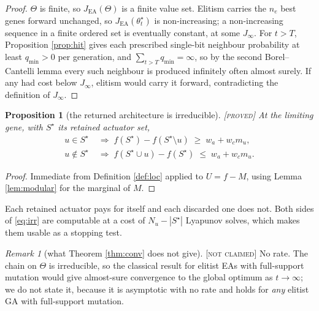 \documentclass[11pt]{article}
\newtheorem{proposition}[theorem]{Proposition}
\theoremstyle{definition}
\theoremstyle{remark}
\newtheorem{remark}[theorem]{Remark}
\newcommand{\JEA}{J_{\mathrm{EA}}}
\newcommand{\Sstar}{S^{\star}}
\newcommand{\tagged}[1]{\textsc{[#1]}}
\begin{document}
\begin{proof}
$\Theta$ is finite, so $\JEA(\Theta)$ is a finite value set. Elitism carries the
$n_e$ best genes forward unchanged, so $\JEA(\theta^\star_t)$ is non-increasing; a
non-increasing sequence in a finite ordered set is eventually constant, at some
$J_\infty$. For $t > T$, Proposition \ref{prop:hit} gives each prescribed
single-bit neighbour probability at least $q_{\min} > 0$ per generation, and
$\sum_{t>T} q_{\min} = \infty$, so by the second Borel--Cantelli lemma every such
neighbour is produced infinitely often almost surely. If any had cost below
$J_\infty$, elitism would carry it forward, contradicting the definition of
$J_\infty$.
\end{proof}

\begin{proposition}[the returned architecture is irreducible]\label{prop:irr} \tagged{proved}
At the limiting gene, with $\Sstar$ its retained actuator set,
\begin{equation}\label{eq:irr}
\begin{aligned}
  u \in \Sstar &\;\Longrightarrow\; f(\Sstar) - f(\Sstar \setminus u) \;\geq\; w_a + w_c m_u, \\
  u \notin \Sstar &\;\Longrightarrow\; f(\Sstar \cup u) - f(\Sstar) \;\leq\; w_a + w_c m_u .
\end{aligned}
\end{equation}
\end{proposition}

\begin{proof}
Immediate from Definition \ref{def:loc} applied to $U = f - M$, using Lemma
\ref{lem:modular} for the marginal of $M$.
\end{proof}

Each retained actuator pays for itself and each discarded one does not. Both sides
of \eqref{eq:irr} are computable at a cost of $N_u - |\Sstar|$ Lyapunov solves,
which makes them usable as a stopping test.

\begin{remark}[what Theorem \ref{thm:conv} does not give]\label{rem:norate} \tagged{not claimed}
No rate. The chain on $\Theta$ is irreducible, so the classical result for elitist
EAs with full-support mutation would give almost-sure convergence to the global
optimum as $t \to \infty$; we do not state it, because it is asymptotic with no
rate and holds for \emph{any} elitist GA with full-support mutation.
\end{remark}
\end{document}
